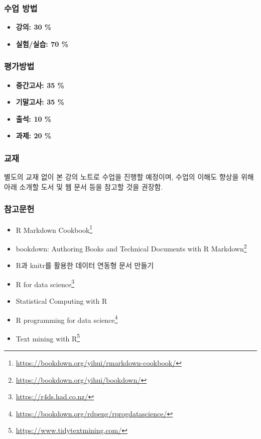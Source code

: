 \documentclass[
  11pt,
]{krantz}
\makeatletter
\providecommand{\tightlist}{%
  \setlength{\itemsep}{0pt}\setlength{\parskip}{0pt}}
\renewcommand{\href}[2]{#2\footnote{\url{#1}}}
\newenvironment{kframe}{%
\medskip{}
\setlength{\fboxsep}{.8em}
 \def\at@end@of@kframe{}%
 \ifinner\ifhmode%
  \def\at@end@of@kframe{\end{minipage}}%
  \begin{minipage}{\columnwidth}%
 \fi\fi%
 \def\FrameCommand##1{\hskip\@totalleftmargin \hskip-\fboxsep
 \colorbox{shadecolor}{##1}\hskip-\fboxsep
     \hskip-\linewidth \hskip-\@totalleftmargin \hskip\columnwidth}%
 \MakeFramed {\advance\hsize-\width
   \@totalleftmargin\z@ \linewidth\hsize
   \@setminipage}}%
 {\par\unskip\endMakeFramed%
 \at@end@of@kframe}
\renewenvironment{quote}{\begin{kframe}}{\end{kframe}}
\makeatother
\begin{document}
\hypertarget{course-method}{%
\subsubsection*{수업 방법}\label{course-method}}


\begin{itemize}
\tightlist
\item
  \textbf{강의: 30 \%}
\item
  \textbf{실험/실습: 70 \%}
\end{itemize}

\hypertarget{grade-method}{%
\subsubsection*{평가방법}\label{grade-method}}


\begin{quote}
\begin{itemize}
\tightlist
\item
  \textbf{중간고사: 35 \%}
\item
  \textbf{기말고사: 35 \%}
\item
  \textbf{출석: 10 \%}
\item
  \textbf{과제: 20 \%}
\end{itemize}
\end{quote}

\hypertarget{material-course}{%
\subsubsection*{교재}\label{material-course}}


\begin{quote}
별도의 교재 없이 본 강의 노트로 수업을 진행할 예정이며, 수업의 이해도 향상을 위해 아래 소개할 도서 및 웹 문서 등을 참고할 것을 권장함.
\end{quote}

\hypertarget{ref-course}{%
\subsubsection*{참고문헌}\label{ref-course}}


\begin{itemize}
\tightlist
\item
  \href{https://bookdown.org/yihui/rmarkdown-cookbook/}{R Markdown Cookbook} \citep{xie-2020}
\item
  \href{https://bookdown.org/yihui/bookdown/}{bookdown: Authoring Books and Technical Documents with R Markdown} \citep{xie-2016}
\item
  R과 knitr를 활용한 데이터 연동형 문서 만들기 \citep{ko-2014}
\item
  \href{https://r4ds.had.co.nz/}{R for data science} \citep{wickham-2016r}
\item
  Statistical Computing with R \citep{rizzo-2019}
\item
  \href{https://bookdown.org/rdpeng/rprogdatascience/}{R programming for data science} \citep{peng-2016}
\item
  \href{https://www.tidytextmining.com/}{Text mining with R} \citep{silge-2017}
\end{itemize}
\end{document}
